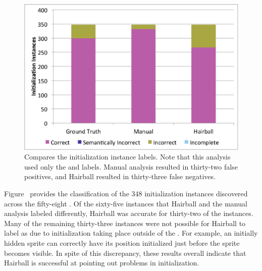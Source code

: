 \begin{figure}[!t]
\centering
\includegraphics[trim=.3in .15in .3in .15in, clip,
  width=5.25in]{graphs/AutoInit.eps}
\caption{Compares the initialization instance labels. Note that this analysis
  used only the \correct{} and \incor{} labels. Manual analysis resulted in
  thirty-two false positives, and Hairball resulted in thirty-three false
  negatives.}
\end{figure}

Figure~ provides the classification of the 348
initialization instances discovered across the fifty-eight . Of the
sixty-five instances that Hairball and the manual analysis labeled differently,
Hairball was accurate for thirty-two of the instances. Many of the remaining
thirty-three instances were not possible for Hairball to label as \correct{}
due to initialization taking place outside of the \initzone{}. For example, an
initially hidden sprite can correctly have its position initialized just before
the sprite becomes visible. In spite of this discrepancy, these results overall
indicate that Hairball is successful at pointing out problems in
initialization.

